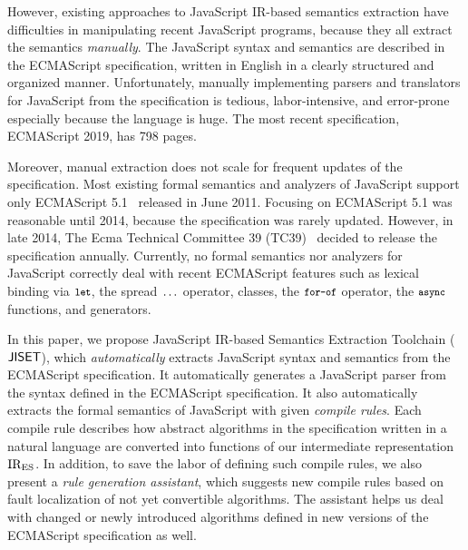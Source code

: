 However, existing approaches to JavaScript IR-based semantics
extraction have difficulties in manipulating recent JavaScript
programs, because they all extract the semantics \textit{manually}.
The JavaScript syntax and semantics are described in the ECMAScript
specification, written in English in a clearly structured and
organized manner.  Unfortunately, manually implementing parsers and
translators for JavaScript from the specification is tedious,
labor-intensive, and error-prone especially because the language is
huge.  The most recent specification, ECMAScript 2019, has 798 pages.

Moreover, manual extraction does not scale for frequent updates of the
specification.  Most existing formal semantics and analyzers of
JavaScript support only ECMAScript 5.1~\cite{ecma5} released in June 2011.
Focusing on ECMAScript 5.1 was reasonable until 2014, because the
specification was rarely updated.  However, in late 2014, The Ecma
Technical Committee 39 (TC39)~\cite{tc39} decided to release the
specification annually.  Currently, no formal semantics
nor analyzers for JavaScript correctly deal with recent ECMAScript
features such as lexical binding via \( \texttt{\footnotesize let} \), the spread
\( \texttt{\footnotesize...} \) operator, classes, the \( \texttt{\footnotesize for-of} \) operator,
the \( \texttt{\footnotesize async} \) functions, and generators.

In this paper, we propose JavaScript IR-based Semantics Extraction
Toolchain (\( \text{\sf JISET} \)), which \textit{automatically} extracts JavaScript
syntax and semantics from the ECMAScript specification.  It
automatically generates a JavaScript parser from the syntax defined in
the ECMAScript specification.  It also automatically extracts the
formal semantics of JavaScript with given \textit{compile rules}.
Each compile rule describes how abstract algorithms in the
specification written in a natural language are converted into
functions of our intermediate representation \( \text{IR}_\text{ES} \).  In
addition, to save the labor of defining such compile rules, we also
present a \textit{rule generation assistant}, which suggests new
compile rules based on fault localization of not yet convertible
algorithms.  The assistant helps us deal with changed or newly
introduced algorithms defined in new versions of the ECMAScript
specification as well.


